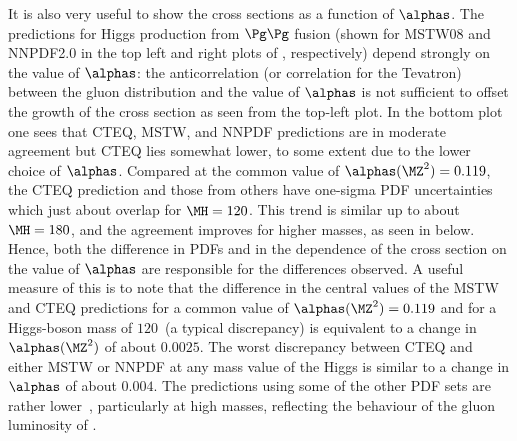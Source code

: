 It is also very useful to show the cross sections as a
function of $\alphas$.
The predictions for Higgs production  from $\Pg\Pg$ fusion
(shown for MSTW08 and NNPDF2.0 in the top left and right plots of 
, respectively) depend strongly on the value
of $\alphas$: the anticorrelation (or correlation for the Tevatron) 
between the gluon distribution and
the value of $\alphas$ is not sufficient to offset the growth of the
cross section as seen from the top-left plot.
In the bottom plot one sees that 
CTEQ, MSTW, and NNPDF predictions are in moderate agreement
but CTEQ lies somewhat lower, to some extent due to
the lower choice of $\alphas$. Compared at the common value of 
$\alphas(\MZ^2)=0.119$, the CTEQ prediction and those from others have 
one-sigma PDF uncertainties which just about overlap  for
$\MH=120$\UGeV. This trend is similar up to about 
$\MH=180$\UGeV, and the agreement 
improves for higher masses, as seen in  below. 
Hence, both the difference in PDFs and
in the dependence of the cross section on the value of $\alphas$ are
responsible for the differences observed. A useful measure of this 
is to note that the difference in the central values of the MSTW and 
CTEQ predictions for a common value of $\alphas(\MZ^2)=0.119$ and for a 
Higgs-boson  mass of $120$\UGeV\ (a typical discrepancy) is equivalent
 to a change in 
$\alphas(\MZ^2)$ of about $0.0025$. The worst discrepancy between 
CTEQ and either MSTW or NNPDF at any mass value of the Higgs 
is similar to a change in $\alphas$ of about $0.004$.
The predictions using some of the other PDF sets are rather 
lower~\cite{PDF4LHCwiki}, 
particularly at high masses, reflecting the
behaviour of the gluon luminosity of . 

